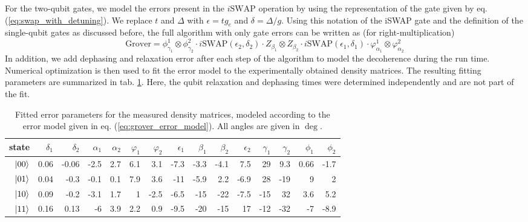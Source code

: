 For the two-qubit gates, we model the errors present in the $i\mathrm{SWAP}$ operation by using the representation of the gate given by eq. (\ref{eq:swap_with_detuning}). We replace $t$ and $\Delta$ with $\epsilon = t g_{e}$ and $\delta = \Delta / g$. Using this notation of the iSWAP gate and the definition of the single-qubit gates as discussed before, the full algorithm with only gate errors can be written as (for right-multiplication)
%
\begin{equation}
\mathrm{Grover} = \phi_{\gamma_1}^1\otimes \phi_{\gamma_2}^2\cdot i\mathrm{SWAP}(\epsilon_2,\delta_2)\cdot Z_{\beta_1}\otimes Z_{\beta_2}\cdot i\mathrm{SWAP}(\epsilon_1,\delta_1)\cdot\varphi_{\alpha_1}^1\otimes \varphi_{\alpha_2}^2 \label{eq:grover_error_model}
\end{equation}
%
In addition, we add dephasing and relaxation error after each step of the algorithm to model the decoherence during the run time. Numerical optimization is then used to fit the error model to the experimentally obtained density matrices. The resulting fitting parameters are summarized in tab. \ref{tab:grover_error_parameters}. Here, the qubit relaxation and dephasing times were determined independently and are not part of the fit.

\begin{table}[ht!]
\centering
\footnotesize{
\begin{tabular}{r|rrrrrrrrrrrrrr}
state & $\delta_1$ & $\delta_2$ & $\alpha_1$ & $\alpha_2$ & $\varphi_1$ & $\varphi_2$ & $\epsilon_1$ & $\beta_1$ & $\beta_2$ & $\epsilon_2$ & $\gamma_1$ & $\gamma_2$ & $\phi_1$ & $\phi_2$ \\ \hline
$\left| 00 \right>$ & 0.06 & -0.06 & -2.5 & 2.7 & 6.1 & 3.1 & -7.3 & -3.3 & -4.1 & 7.5 & 29 & 9.3 & 0.66 & -1.7
 \\
$\left| 01 \right>$ & 0.04 & -0.3 & -0.1 & 0.1 & 7.9 & 3.6 & -11 & -5.9 & 2.2 & -6.9 & 28 & -19 &  9 &  2
 \\
$\left| 10 \right>$ & 0.09 & -0.2 & -3.1 & 1.7 &  1 & -2.5 & -6.5 & -15 & -22 & -7.5 & -15 & 32 & 3.6 & 5.2
\\
$\left| 11 \right>$ & 0.16 & 0.13 & -6 & 3.9 & 2.2 & 0.9 & -9.5 & -20 & -15 & 17 & -12 & -32 & -7 & -8.9
\end{tabular}
}
\caption[Fitted gate error parameters of the Grover algorithm]{Fitted error parameters for the measured density matrices, modeled according to the error model given in eq. (\ref{eq:grover_error_model}). All angles are given in $\deg$.}
\label{tab:grover_error_parameters}
\end{table}

